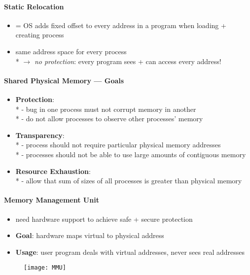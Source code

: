 \paragraph{Static Relocation}
\begin{itemize}
  \item = OS adds fixed offset to every address in a program when loading + creating process
  \item same address space for every process \\*
    \( \to \) \emph{no protection}: every program sees + can access every address!
\end{itemize}

\paragraph{Shared Physical Memory --- Goals}
\begin{itemize}
  \item \textbf{Protection}: \\*
    - bug in one process must not corrupt memory in another \\*
    - do not allow processes to observe other processes' memory
  \item \textbf{Transparency}: \\*
    - process should not require particular physical memory addresses \\*
    - processes should not be able to use large amounts of contiguous memory
  \item \textbf{Resource Exhaustion}: \\*
    - allow that sum of sizes of all processes is greater than physical memory
\end{itemize}

\paragraph{Memory Management Unit}
\begin{itemize}
  \item need hardware support to achieve safe + secure protection
  \item \textbf{Goal}: hardware maps virtual to physical address
  \item \textbf{Usage}: user program deals with virtual addresses, never sees real addresses
\end{itemize}
\begin{figure}[h]\centering\label{MMU}\texttt{[image: MMU]}\end{figure}

